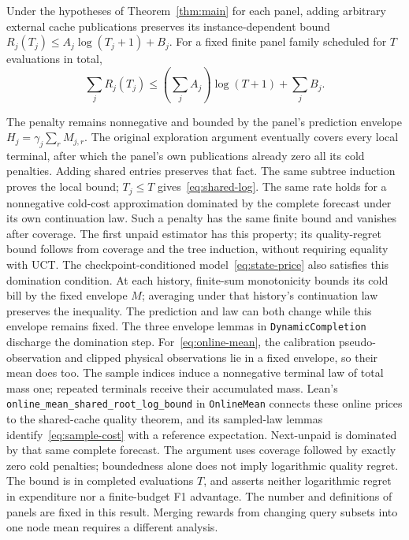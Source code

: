 \begin{theorem}
\label{thm:shared}
Under the hypotheses of Theorem~\ref{thm:main} for each panel, adding arbitrary
external cache publications preserves its instance-dependent bound
$R_j(T_j)\le A_j\log(T_j+1)+B_j$.
For a fixed finite panel family scheduled for $T$ evaluations in total,
\begin{equation}
 \sum_j R_j(T_j)\le
 \left(\sum_j A_j\right)\log(T+1)+\sum_j B_j.
 \label{eq:shared-log}
\end{equation}
\end{theorem}
The penalty remains nonnegative and bounded by the panel's prediction envelope $H_j=\gamma_j\sum_r M_{j,r}$. The original exploration argument eventually covers every local
terminal, after which the panel's own publications already zero all its cold
penalties. Adding shared entries preserves that fact. The same subtree
induction proves the local bound; $T_j\le T$ gives~\eqref{eq:shared-log}.
The same rate holds for a nonnegative cold-cost approximation dominated by
the complete forecast under its own continuation law. Such a penalty has the
same finite bound and vanishes after coverage. The first unpaid estimator
has this property; its quality-regret bound follows from coverage and the
tree induction, without requiring equality with UCT.
The checkpoint-conditioned model~\eqref{eq:state-price} also satisfies this
domination condition. At each history, finite-sum monotonicity bounds its cold
bill by the fixed envelope $M$; averaging under that history's continuation
law preserves the inequality. The prediction and law can both change while
this envelope remains fixed. The three envelope lemmas in
\texttt{DynamicCompletion} discharge the domination step.
For~\eqref{eq:online-mean}, the calibration pseudo-observation and clipped
physical observations lie in a fixed envelope, so their mean does too.
The sample indices induce a nonnegative terminal law of total mass one;
repeated terminals receive their accumulated mass. Lean's
\texttt{online\_mean\_shared\_root\_log\_bound} in \texttt{OnlineMean}
connects these online prices to the shared-cache quality theorem, and its
sampled-law lemmas identify~\eqref{eq:sample-cost} with a reference expectation.
Next-unpaid is dominated by that same complete forecast. The argument uses
coverage followed by exactly zero cold penalties; boundedness alone does not
imply logarithmic quality regret. The bound is in completed evaluations $T$,
and asserts neither logarithmic regret in expenditure nor a finite-budget F1 advantage.
The number and definitions of panels are fixed in this result. Merging rewards
from changing query subsets into one node mean requires a different analysis.

